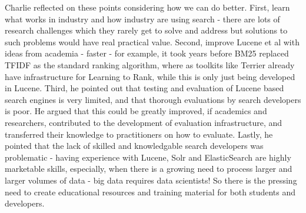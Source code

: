 Charlie reflected on these points considering how we can do better. First, learn what works in industry and how industry are using search - there are lots of research challenges which they rarely get to solve and address but solutions to such problems would have real practical value. Second, improve Lucene et al with ideas from academia - faster - for example, it took years before BM25 replaced TFIDF as the standard ranking algorithm, where as toolkits like Terrier already have infrastructure for Learning to Rank, while this is only just being developed in Lucene. Third, he pointed out that testing and evaluation of Lucene based search engines is very limited, and that thorough evaluations by search developers is poor. He argued that this could be greatly improved, if academics and researchers, contributed to the development of evaluation infrastructure, and transferred their knowledge to practitioners on how to evaluate. Lastly, he pointed that the lack of skilled and knowledgable search developers was problematic - having experience with Lucene, Solr and ElasticSearch are highly marketable skills, especially, when there is a growing need to process larger and larger volumes of data - big data requires data scientists! So there is the pressing need to create educational resources and training material for both students and developers. 
